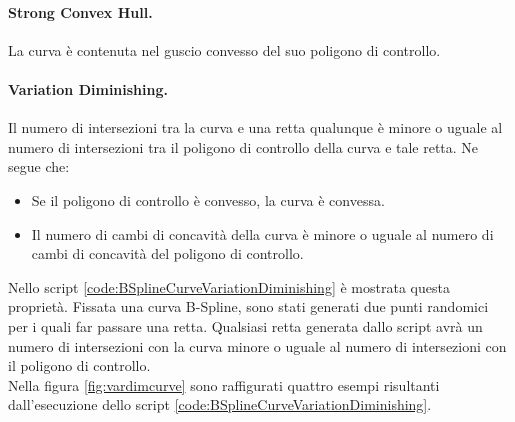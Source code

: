 \documentclass[a4paper, 12pt]{article}
\begin{document}
\paragraph{Strong Convex Hull.}
La curva è contenuta nel guscio convesso del suo poligono di controllo.

\paragraph{Variation Diminishing.}
Il numero di intersezioni tra la curva e una retta qualunque è minore o uguale al numero di intersezioni tra il poligono di controllo della curva e tale retta. Ne segue che:
\begin{itemize}
	\item Se il poligono di controllo è convesso, la curva è convessa.
	\item Il numero di cambi di concavità della curva è minore o uguale al numero di
	      cambi di concavità del poligono di controllo.
\end{itemize}

Nello script \ref{code:BSplineCurveVariationDiminishing} è mostrata questa proprietà. Fissata una curva B-Spline, sono stati generati due punti randomici per i quali far passare una retta. Qualsiasi retta generata dallo script avrà un numero di intersezioni con la curva minore o uguale al numero di intersezioni con il poligono di controllo.\\
Nella figura \ref{fig:vardimcurve} sono raffigurati quattro esempi risultanti dall'esecuzione dello script \ref{code:BSplineCurveVariationDiminishing}.
\end{document}

